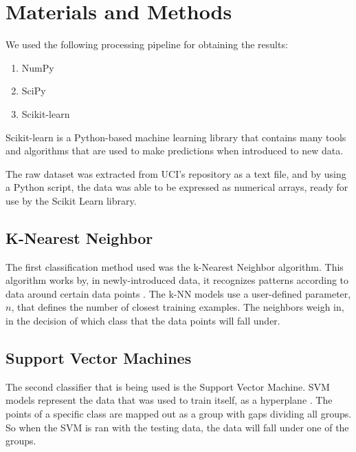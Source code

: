 \documentclass[conference,compsoc]{IEEEtran}
\begin{document}
\section{Materials and Methods}
We used the following processing pipeline for obtaining the results:
\begin{enumerate}
\item NumPy
\item SciPy
\item Scikit-learn
\end{enumerate}

Scikit-learn is a Python-based machine learning library \cite{scikit} that contains many tools and algorithms that are used to make predictions when introduced to new data. 

The raw dataset was extracted from UCI's repository as a text file, and by using a Python script, the data was able to be expressed as numerical arrays, ready for use by the Scikit Learn library. 

\subsection{K-Nearest Neighbor}
The first classification method used was the k-Nearest Neighbor algorithm.  This algorithm works by, in newly-introduced data, 
it recognizes patterns according to data around certain data points \cite{random}. The k-NN models use a user-defined parameter, $n$, that defines the 
number of closest training examples. The neighbors weigh in, in the decision of which class that the data points will fall under.

\subsection{Support Vector Machines}
The second classifier that is being used is the Support Vector Machine. SVM models represent the data that was used to train itself, as a hyperplane \cite{classsvm}. The points of a specific class are mapped out as a group with gaps dividing all groups. So when the SVM is ran with the testing data, the data will fall under one of the groups. 
\end{document}
